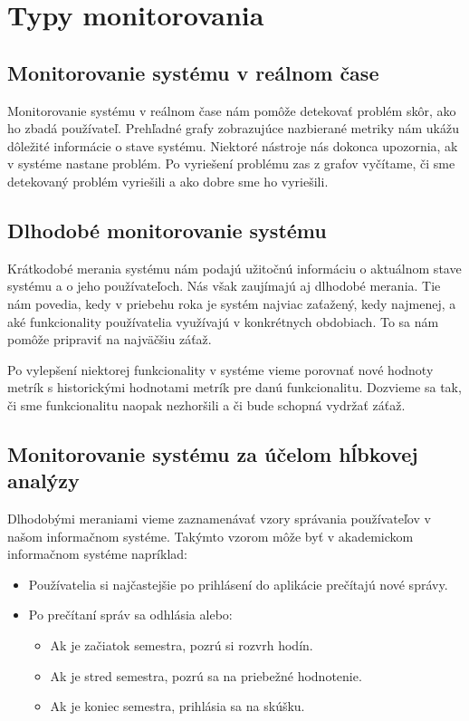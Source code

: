 \documentclass[a4paper, usesections, upjsfrontpage, thesismargins, thesislinespacing, twoside]{rnthesissvk}
\begin{document}
\newpage

\section{Typy monitorovania}

\subsection{Monitorovanie systému v reálnom čase}

Monitorovanie systému v reálnom čase nám pomôže detekovať problém skôr, ako ho zbadá používateľ.
Prehľadné grafy zobrazujúce nazbierané metriky nám ukážu dôležité informácie o stave systému.
Niektoré nástroje nás dokonca upozornia, ak v systéme nastane problém.
Po vyriešení problému zas z grafov vyčítame, či sme detekovaný problém vyriešili a ako dobre sme ho vyriešili.

\subsection{Dlhodobé monitorovanie systému}

Krátkodobé merania systému nám podajú užitočnú informáciu o aktuálnom stave systému a o jeho používateľoch.
Nás však zaujímajú aj dlhodobé merania.
Tie nám povedia, kedy v priebehu roka je systém najviac zaťažený, kedy najmenej, a aké funkcionality používatelia využívajú v konkrétnych obdobiach.
To sa nám pomôže pripraviť na najväčšiu záťaž.

Po vylepšení niektorej funkcionality v systéme vieme porovnať nové hodnoty metrík s historickými hodnotami metrík pre danú funkcionalitu.
Dozvieme sa tak, či sme funkcionalitu naopak nezhoršili a či bude schopná vydržať záťaž.

\subsection{Monitorovanie systému za účelom hĺbkovej analýzy}

Dlhodobými meraniami vieme zaznamenávať vzory správania používateľov v našom informačnom systéme.
Takýmto vzorom môže byť v akademickom informačnom systéme napríklad:

\begin{itemize}
	\item Používatelia si najčastejšie po prihlásení do aplikácie prečítajú nové správy.
	\item Po prečítaní správ sa odhlásia alebo:
	\begin{itemize}
		\item Ak je začiatok semestra, pozrú si rozvrh hodín.
		\item Ak je stred semestra, pozrú sa na priebežné hodnotenie.
		\item Ak je koniec semestra, prihlásia sa na skúšku.
	\end{itemize}
\end{itemize}
\end{document}
